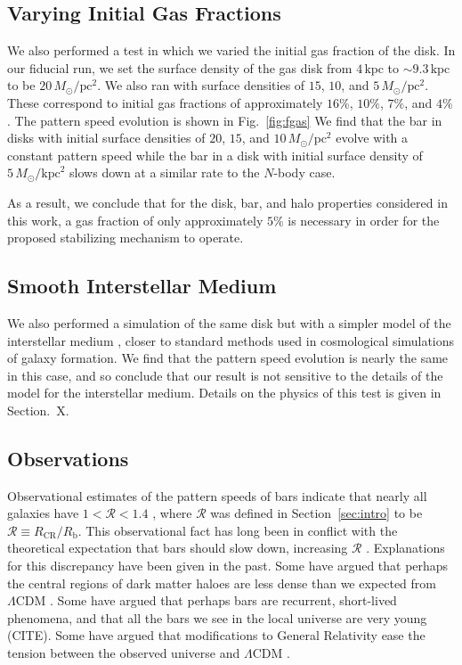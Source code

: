 \documentclass[fleqn,usenatbib]{mnras}
\newcommand{\RCR}{\ensuremath{R_{\textrm{CR}}}}
\newcommand{\Rot}{\ensuremath{\mathcal{R}}}
\newcommand{\Rb}{\ensuremath{R_{\textrm{b}}}}
\newcommand{\Nbody}{$N$-body}
\newcommand{\Msun}{\ensuremath{M_{\odot}}}
\begin{document}
\subsection{Varying Initial Gas Fractions}
We also performed a test in which we varied the initial gas fraction of the
disk. In our fiducial run, we set the surface density of the gas disk from
$4\,\textrm{kpc}$ to $\sim9.3\,\textrm{kpc}$ to be $20\,\Msun/\textrm{pc}^2$.
We also ran with surface densities of $15$, $10$, and
$5\,\Msun/\textrm{pc}^2$. These correspond to initial gas fractions of
approximately $16\%$, $10\%$, $7\%$, and $4\%$. The pattern speed evolution is
shown in Fig.~\ref{fig:fgas} We find that the bar in disks with
initial surface densities of $20$, $15$, and $10\,\Msun/\textrm{pc}^2$ evolve
with a constant pattern speed while the bar in a disk with initial surface
density of $5\,\Msun/\textrm{kpc}^2$ slows down at a similar rate to the \Nbody{} case.

As a result, we conclude that for the disk, bar, and halo properties
considered in this work, a gas fraction of only approximately $5\%$ is
necessary in order for the proposed stabilizing mechanism to operate.



\subsection{Smooth Interstellar Medium}
We also performed a simulation of the same disk but with a simpler model of the
interstellar medium \citep{2003MNRAS.339..289S}, closer to standard methods used
in cosmological simulations of galaxy formation. We find that the pattern speed
evolution is nearly the same in this case, and so conclude that our result is
not sensitive to the details of the model for the interstellar medium. Details
on the physics of this test is given in Section.~X.


\subsection{Observations}
Observational estimates of the pattern speeds of bars indicate that nearly all
galaxies have $1 < \Rot < 1.4$ \citep{2011MSAIS..18...23C, 2015AA...576A.102A,
2019MNRAS.482.1733G, 2020MNRAS.491.3655G}, where $\Rot$ was defined in
Section~\ref{sec:intro} to be $\Rot\equiv \RCR/\Rb$. This observational fact has
long been in conflict with the theoretical expectation that bars should slow
down, increasing \Rot{} \citep[e.g.][]{1984MNRAS.209..729T, 1985MNRAS.213..451W,
2000ApJ...543..704D}. Explanations for this discrepancy have been given in the
past. Some have argued that perhaps the central regions of dark matter haloes
are less dense than we expected from $\Lambda\textrm{CDM}$
\citep[e.g.][]{2000ApJ...543..704D,2021AA...650L..16F}. Some have argued that
perhaps bars are recurrent, short-lived phenomena, and that all the bars we see
in the local universe are very young (CITE). Some have argued that modifications
to General Relativity ease the tension between the observed universe and
$\Lambda\textrm{CDM}$ \citep[e.g.][]{2021MNRAS.503.2833R, 2021MNRAS.508..926R}.
\end{document}
